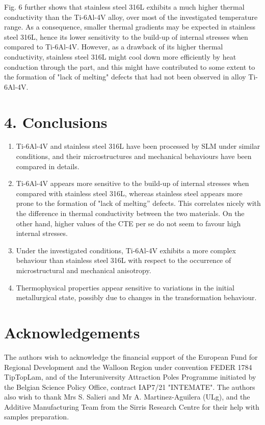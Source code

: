 \documentclass[10pt]{article}
\begin{document}
Fig. 6 further shows that stainless steel 316L exhibits a much higher thermal conductivity than the Ti-6Al-4V alloy, over most of the investigated temperature range. As a consequence, smaller thermal gradients may be expected in stainless steel 316L, hence its lower sensitivity to the build-up of internal stresses when compared to Ti-6Al-4V. However, as a drawback of its higher thermal conductivity, stainless steel 316L might cool down more efficiently by heat conduction through the part, and this might have contributed to some extent to the formation of "lack of melting" defects that had not been observed in alloy Ti-6Al-4V.

\section*{4. Conclusions}
\begin{enumerate}
  \item Ti-6Al-4V and stainless steel 316L have been processed by SLM under similar conditions, and their microstructures and mechanical behaviours have been compared in details.

  \item Ti-6Al-4V appears more sensitive to the build-up of internal stresses when compared with stainless steel 316L, whereas stainless steel appears more prone to the formation of "lack of melting” defects. This correlates nicely with the difference in thermal conductivity between the two materials. On the other hand, higher values of the CTE per se do not seem to favour high internal stresses.

  \item Under the investigated conditions, Ti-6Al-4V exhibits a more complex behaviour than stainless steel 316L with respect to the occurrence of microstructural and mechanical anisotropy.

  \item Thermophysical properties appear sensitive to variations in the initial metallurgical state, possibly due to changes in the transformation behaviour.

\end{enumerate}

\section*{Acknowledgements}
The authors wish to acknowledge the financial support of the European Fund for Regional Development and the Walloon Region under convention FEDER 1784 TipTopLam, and of the Interuniversity Attraction Poles Programme initiated by the Belgian Science Policy Office, contract IAP7/21 "INTEMATE". The authors also wish to thank Mrs S. Salieri and Mr A. Martinez-Aguilera (ULg), and the Additive Manufacturing Team from the Sirris Research Centre for their help with samples preparation.
\end{document}
